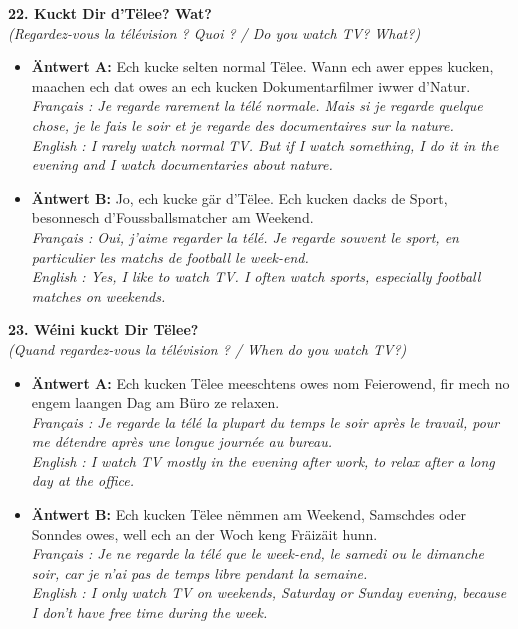 \noindent\textbf{22. Kuckt Dir d'Tëlee? Wat?}\\
\textit{(Regardez-vous la télévision ? Quoi ? / Do you watch TV? What?)}
\begin{itemize}
    \item \textbf{Äntwert A:} Ech kucke selten normal Tëlee. Wann ech awer eppes kucken, maachen ech dat owes an ech kucken Dokumentarfilmer iwwer d'Natur.\\
    \textit{Français : Je regarde rarement la télé normale. Mais si je regarde quelque chose, je le fais le soir et je regarde des documentaires sur la nature.}\\
    \textit{English : I rarely watch normal TV. But if I watch something, I do it in the evening and I watch documentaries about nature.}
    \item \textbf{Äntwert B:} Jo, ech kucke gär d'Tëlee. Ech kucken dacks de Sport, besonnesch d'Foussballsmatcher am Weekend.\\
    \textit{Français : Oui, j'aime regarder la télé. Je regarde souvent le sport, en particulier les matchs de football le week-end.}\\
    \textit{English : Yes, I like to watch TV. I often watch sports, especially football matches on weekends.}
\end{itemize}
\vspace{0.5em}

\noindent\textbf{23. Wéini kuckt Dir Tëlee?}\\
\textit{(Quand regardez-vous la télévision ? / When do you watch TV?)}
\begin{itemize}
    \item \textbf{Äntwert A:} Ech kucken Tëlee meeschtens owes nom Feierowend, fir mech no engem laangen Dag am Büro ze relaxen.\\
    \textit{Français : Je regarde la télé la plupart du temps le soir après le travail, pour me détendre après une longue journée au bureau.}\\
    \textit{English : I watch TV mostly in the evening after work, to relax after a long day at the office.}
    \item \textbf{Äntwert B:} Ech kucken Tëlee nëmmen am Weekend, Samschdes oder Sonndes owes, well ech an der Woch keng Fräizäit hunn.\\
    \textit{Français : Je ne regarde la télé que le week-end, le samedi ou le dimanche soir, car je n'ai pas de temps libre pendant la semaine.}\\
    \textit{English : I only watch TV on weekends, Saturday or Sunday evening, because I don't have free time during the week.}
\end{itemize}
\vspace{0.5em}

